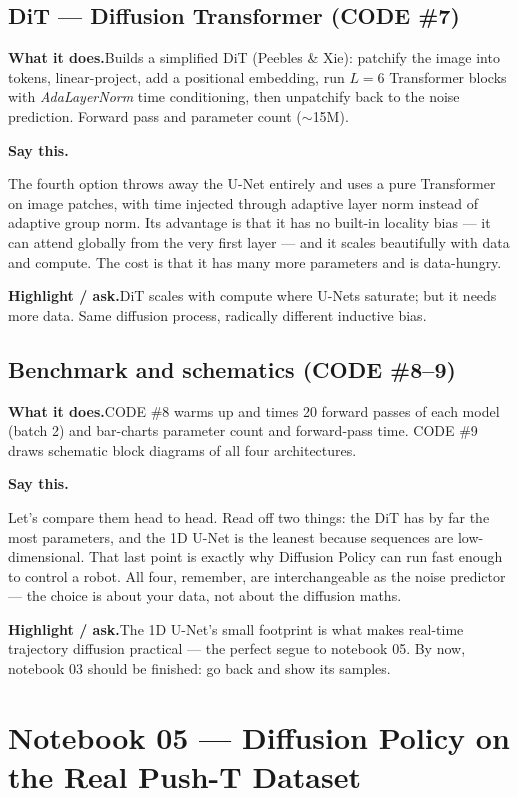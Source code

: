 \documentclass[11pt]{article}
\newenvironment{saythis}{%
  \par\smallskip\noindent
  \begin{list}{}{%
    \setlength{\leftmargin}{1.2em}%
    \setlength{\rightmargin}{0.5em}%
    \setlength{\topsep}{2pt}%
  }\item\relax
  \color{sayrule}\textbf{Say this.}\hspace{0.4em}\color{black}\itshape
}{%
  \end{list}\par\smallskip
}
\newcommand{\highlight}[1]{\par\smallskip\noindent\textcolor{hlcolor}{\textbf{Highlight / ask.}}\hspace{0.4em}#1\par\smallskip}
\newcommand{\whatdoes}[1]{\par\noindent\textbf{What it does.}\hspace{0.4em}#1\par}
\begin{document}
\subsection{DiT --- Diffusion Transformer (CODE \#7)}
\whatdoes{Builds a simplified DiT (Peebles \& Xie): patchify the image into tokens, linear-project, add a
positional embedding, run $L=6$ Transformer blocks with \emph{AdaLayerNorm} time conditioning, then
unpatchify back to the noise prediction. Forward pass and parameter count ($\sim$15M).}
\begin{saythis}
The fourth option throws away the U-Net entirely and uses a pure Transformer on image patches, with time
injected through adaptive layer norm instead of adaptive group norm. Its advantage is that it has no
built-in locality bias --- it can attend globally from the very first layer --- and it scales beautifully
with data and compute. The cost is that it has many more parameters and is data-hungry.
\end{saythis}
\highlight{DiT scales with compute where U-Nets saturate; but it needs more data. Same diffusion process,
radically different inductive bias.}

\subsection{Benchmark and schematics (CODE \#8--9)}
\whatdoes{CODE \#8 warms up and times 20 forward passes of each model (batch 2) and bar-charts parameter
count and forward-pass time. CODE \#9 draws schematic block diagrams of all four architectures.}
\begin{saythis}
Let's compare them head to head. Read off two things: the DiT has by far the most parameters, and the
1D U-Net is the leanest because sequences are low-dimensional. That last point is exactly why Diffusion
Policy can run fast enough to control a robot. All four, remember, are interchangeable as the noise
predictor --- the choice is about your data, not about the diffusion maths.
\end{saythis}
\highlight{The 1D U-Net's small footprint is what makes real-time trajectory diffusion practical ---
the perfect segue to notebook 05. By now, notebook 03 should be finished: go back and show its samples.}

\section{Notebook 05 --- Diffusion Policy on the Real Push-T Dataset}
\end{document}
